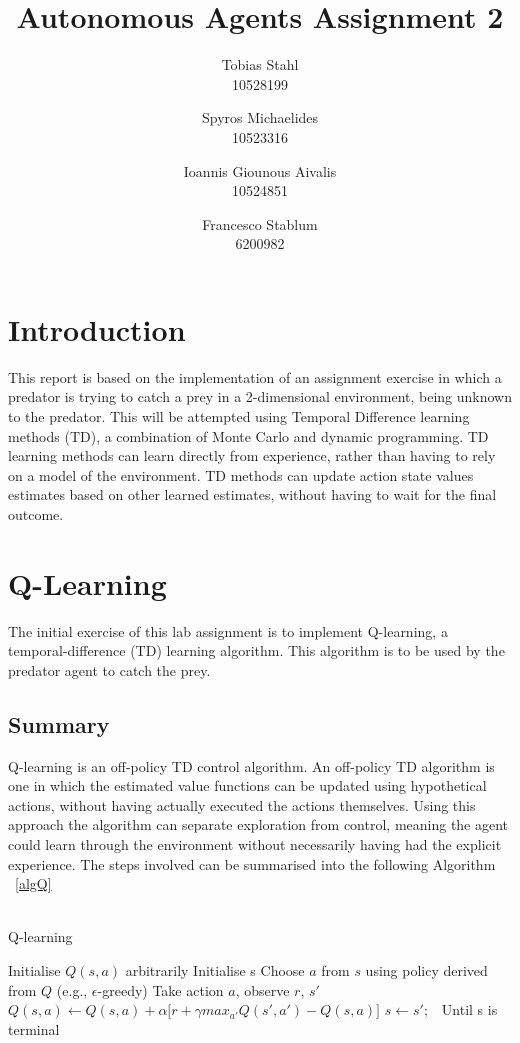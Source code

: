 \documentclass[11pt]{article}
\title{
	\textbf{Autonomous Agents Assignment 2}
}
\author{Tobias Stahl \\ 10528199 \and Spyros Michaelides \\ 10523316 \and Ioannis Giounous Aivalis \\ 10524851 \and Francesco Stablum \\ 6200982}
\begin{document}
\maketitle




\section{Introduction}
This report is based on the implementation of an assignment exercise in which a predator is trying to catch a prey in a 2-dimensional environment, being unknown to the predator. This will be attempted  using Temporal Difference learning methods (TD), a combination of Monte Carlo and dynamic programming. TD learning methods can learn directly from experience, rather than having to rely on a model of the environment. TD methods can update action state values estimates based on other learned estimates, without having to wait for the final outcome. 


\section{Q-Learning}
The initial exercise of this lab assignment is to implement Q-learning, a temporal-difference (TD) learning algorithm. This algorithm is to be used by the predator agent to catch the prey.



\subsection{Summary}
Q-learning is an off-policy TD control algorithm. An off-policy TD algorithm is one in which the estimated value functions can be updated using hypothetical actions, without having actually executed the actions themselves. Using this approach the algorithm can separate exploration from control, meaning the agent could learn through the environment without necessarily having had the explicit experience.
The steps involved can be summarised into the following Algorithm ~\ref{algQ}\\\\



\begin{algorithm}
\caption{Q-learning}
\begin{algorithmic}
\label{algQ}
\STATE Initialise $Q(s,a)$ arbitrarily
\STATE Initialise s
\STATE Choose $a$ from $s$ using policy derived from $Q$ (e.g., $\epsilon$-greedy)
\STATE Take action $a$, observe $r$, $s'$
\STATE $Q(s,a) \leftarrow Q(s,a) + \alpha \lbrack r + \gamma max_{a'} Q(s',a') - Q(s,a)\rbrack$
\STATE $s \leftarrow s';$\
\ENDFOR
\STATE Until s is terminal
\ENDFOR
\end{algorithmic}
\end{algorithm}
\end{document}

